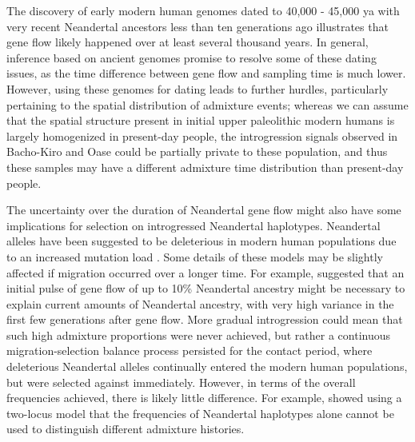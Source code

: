 \documentclass[11pt]{article}
\begin{document}
The discovery of early modern human genomes dated to 40,000 - 45,000 ya with very recent Neandertal ancestors less than ten generations ago \citep{fu_genome_2014, hajdinjak_early_2021} illustrates that gene flow likely happened over at least several thousand years.  In general, inference based on ancient genomes \citep{fu_genome_2014, fu_early_2015, moorjani_genetic_2016} promise to resolve some of these dating issues, as the time difference between gene flow and sampling time is much lower. However, using these genomes for dating leads to further hurdles, particularly pertaining to the spatial distribution of admixture events; whereas we can assume that the spatial structure present in initial upper paleolithic modern humans is largely homogenized in present-day people, the introgression signals observed in Bacho-Kiro and Oase could be partially private to these population, and thus these samples may have a different admixture time distribution than present-day people.

The uncertainty over the duration of Neandertal gene flow might also have some implications for selection on introgressed Neandertal haplotypes. Neandertal alleles have been suggested to be deleterious in modern human populations due to an increased mutation load \citep{harris_genetic_2016, juric_strength_2016}. Some details of these models may be slightly affected if migration occurred over a longer time. For example, \cite{harris_genetic_2016} suggested that an initial pulse of gene flow of up to 10\% Neandertal ancestry might be necessary to explain current amounts of Neandertal ancestry, with very high variance in the first few generations after gene flow. More gradual introgression could mean that such high admixture proportions were never achieved, but rather a continuous migration-selection balance process persisted for the contact period, where deleterious Neandertal alleles continually entered the modern human populations, but were selected against immediately. 
However, in terms of the overall frequencies achieved, there is likely little difference. For example, \cite{juric_strength_2016} showed using a two-locus model that the frequencies of Neandertal haplotypes alone cannot be used to distinguish different admixture histories.
\end{document}

